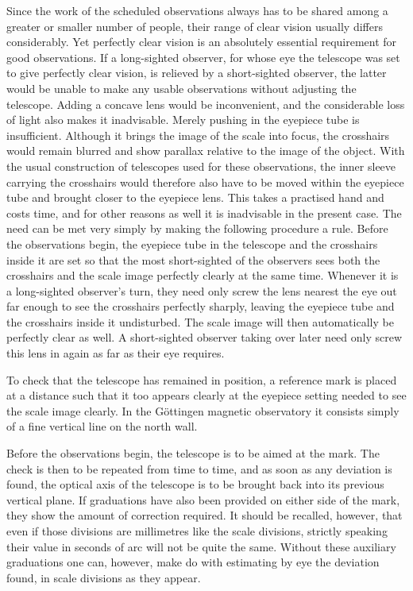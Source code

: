 Since the work of the scheduled observations always has to be shared among a greater or smaller number of people, their range of clear vision usually differs considerably. Yet perfectly clear vision is an absolutely essential requirement for good observations. If a long-sighted observer, for whose eye the telescope was set to give perfectly clear vision, is relieved by a short-sighted observer, the latter would be unable to make any usable observations
without adjusting the telescope. Adding a concave lens would be inconvenient, and the considerable loss of light also makes it inadvisable. Merely pushing in the eyepiece tube is insufficient. Although it brings the image of the scale into focus, the crosshairs would remain blurred and show parallax relative to the image of the object. With the usual construction of telescopes used for these observations, the inner sleeve carrying the crosshairs would therefore also have to be moved within the eyepiece tube and brought closer to the eyepiece lens. This takes a practised hand and costs time, and for other reasons as well it is inadvisable in the present case. The need can be met very simply by making the following procedure a rule. Before the observations begin, the eyepiece tube in the telescope and the crosshairs inside it are set so that the most short-sighted of the observers sees both the crosshairs and the scale image perfectly clearly at the same time. Whenever it is a long-sighted observer’s turn, they need only screw the lens nearest the eye out far enough to see the crosshairs perfectly sharply, leaving the eyepiece tube and the crosshairs inside it undisturbed. The scale image will then automatically be perfectly clear as well. A short-sighted observer taking over later need only screw this lens in again as far as their eye requires.

To check that the telescope has remained in position, a reference mark is placed at a distance such that it too appears clearly at the eyepiece setting needed to see the scale image clearly. In the Göttingen magnetic observatory it consists simply of a fine vertical line on the north wall.

Before the observations begin, the telescope is to be aimed at the mark. The check is then to be repeated from time to time, and as soon as any deviation is found, the optical axis of the telescope is to be brought back into its previous vertical plane. If graduations have also been provided on either side of the mark, they show the amount of correction required. It should be recalled, however, that even if those divisions are millimetres like the scale divisions, strictly speaking their value in seconds of arc will not be quite the same. Without these auxiliary graduations one can, however, make do with estimating by eye the deviation found, in scale divisions as they appear.


